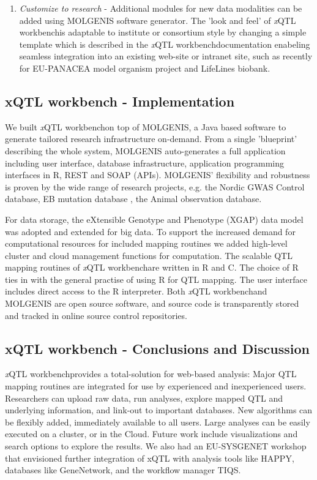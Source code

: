 \documentclass[8pt, twoside, a5paper]{report}
\newcommand{\italic}[1]{\textit{#1}}
\newcommand{\xqtlwb}{{\it x}QTL workbench}
\begin{document}
\begin{enumerate}
\item \italic{Customize to research} - Additional modules for new data modalities can be added using MOLGENIS software 
generator\cite{Swertz:2010b}. The 'look and feel' of \xqtlwb is adaptable to institute or consortium style by changing a 
simple template which is described in the \xqtlwb documentation enabeling seamless integration into an existing web-site
or intranet site, such as recently for EU-PANACEA model organism project and LifeLines biobank.
\end{enumerate}

\subsection{xQTL workbench - Implementation}

We built \xqtlwb on top of MOLGENIS\cite{Swertz:2004}, a Java based software to generate tailored research infrastructure 
on-demand\cite{Swertz:2007}. From a single 'blueprint' describing the whole system, MOLGENIS auto-generates a full 
application including user interface, database infrastructure, application programming interfaces in R, REST and SOAP 
(APIs). MOLGENIS' flexibility and robustness is proven by the wide range of research projects, e.g. the Nordic GWAS 
Control database\cite{Leu:2010}, EB mutation database \cite{Akker:2011}, the Animal observation database\cite{Swertz:2010b}.

For data storage, the eXtensible Genotype and Phenotype (XGAP) data model was adopted\cite{Swertz:2010a} and extended 
for big data. To support the increased demand for computational resources for included mapping routines we added high-level 
cluster and cloud management functions for computation. The scalable QTL mapping routines of \xqtlwb are written in R 
and C. The choice of R ties in with the general practise of using R for QTL mapping. The user interface includes direct 
access to the R interpreter.  Both \xqtlwb and MOLGENIS are open source software, and source code is transparently
stored and tracked in online source control repositories.

\subsection{xQTL workbench - Conclusions and Discussion}

\xqtlwb provides a total-solution for web-based analysis: Major QTL mapping routines are integrated for use by experienced 
and inexperienced users. Researchers can upload raw data, run analyses, explore mapped QTL and underlying information, and 
link-out to important databases. New algorithms can be flexibly added, immediately available to all users. Large analyses 
can be easily executed on a cluster, or in the Cloud. Future work include visualizations and search options to explore the 
results. We also had an EU-SYSGENET workshop that envisioned further integration of xQTL with analysis tools like HAPPY, 
databases like GeneNetwork, and the workflow manager TIQS\cite{Durrant:2012}.
\end{document}
